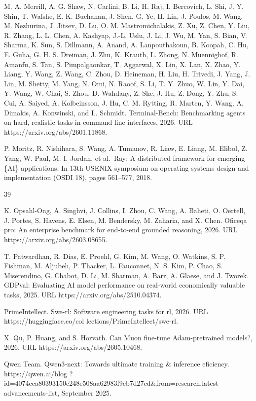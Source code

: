 \documentclass[
  10
]{article}
\begin{document}
M. A. Merrill, A. G. Shaw, N. Carlini, B. Li, H. Raj, I. Bercovich, L.
Shi, J. Y. Shin, T. Walshe, E. K. Buchanan, J. Shen, G. Ye, H. Lin, J.
Poulos, M. Wang, M. Nezhurina, J. Jitsev, D. Lu, O. M. Mastromichalakis,
Z. Xu, Z. Chen, Y. Liu, R. Zhang, L. L. Chen, A. Kashyap, J.-L. Uslu, J.
Li, J. Wu, M. Yan, S. Bian, V. Sharma, K. Sun, S. Dillmann, A. Anand, A.
Lanpouthakoun, B. Koopah, C. Hu, E. Guha, G. H. S. Dreiman, J. Zhu, K.
Krauth, L. Zhong, N. Muennighof, R. Amanfu, S. Tan, S. Pimpalgaonkar, T.
Aggarwal, X. Lin, X. Lan, X. Zhao, Y. Liang, Y. Wang, Z. Wang, C. Zhou,
D. Heineman, H. Liu, H. Trivedi, J. Yang, J. Lin, M. Shetty, M. Yang, N.
Omi, N. Raoof, S. Li, T. Y. Zhuo, W. Lin, Y. Dai, Y. Wang, W. Chai, S.
Zhou, D. Wahdany, Z. She, J. Hu, Z. Dong, Y. Zhu, S. Cui, A. Saiyed, A.
Kolbeinsson, J. Hu, C. M. Rytting, R. Marten, Y. Wang, A. Dimakis, A.
Konwinski, and L. Schmidt. Terminal-Bench: Benchmarking agents on hard,
realistic tasks in command line interfaces, 2026. URL
https://arxiv.org/abs/2601.11868.

P. Moritz, R. Nishihara, S. Wang, A. Tumanov, R. Liaw, E. Liang, M.
Elibol, Z. Yang, W. Paul, M. I. Jordan, et al.~Ray: A distributed
framework for emerging \{AI\} applications. In 13th USENIX symposium on
operating systems design and implementation (OSDI 18), pages 561--577,
2018.

39

K. Opsahl-Ong, A. Singhvi, J. Collins, I. Zhou, C. Wang, A. Baheti, O.
Oertell, J. Portes, S. Havens, E. Elsen, M. Bendersky, M. Zaharia, and
X. Chen. Oficeqa pro: An enterprise benchmark for end-to-end grounded
reasoning, 2026. URL https://arxiv.org/abs/2603.08655.

T. Patwardhan, R. Dias, E. Proehl, G. Kim, M. Wang, O. Watkins, S. P.
Fishman, M. Aljubeh, P. Thacker, L. Fauconnet, N. S. Kim, P. Chao, S.
Miserendino, G. Chabot, D. Li, M. Sharman, A. Barr, A. Glaese, and J.
Tworek. GDPval: Evaluating AI model performance on real-world
economically valuable tasks, 2025. URL https://arxiv.org/abs/2510.04374.

PrimeIntellect. Swe-rl: Software engineering tasks for rl, 2026. URL
https://huggingface.co/col lections/PrimeIntellect/swe-rl.

X. Qu, P. Huang, and S. Horvath. Can Muon fine-tune Adam-pretrained
models?, 2026. URL https://arxiv.org/abs/2605.10468.

Qwen Team. Qwen3-next: Towards ultimate training \& inference eficiency.
https://qwen.ai/blog
?id=4074cca80393150c248e508aa62983f9cb7d27cd\&from=research.latest-advancements-list,
September 2025.
\end{document}
